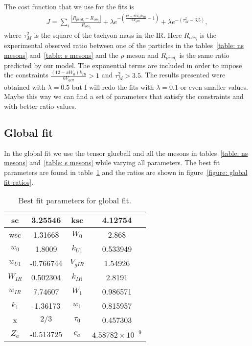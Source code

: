 \documentclass[a4paper,12pt]{article}
\begin{document}
The cost function that we use for the fits is
\begin{align}
J = \sum_{i} \frac{|R_{pred_i} - R_{obs_i}|}{R_{obs_i}} + \lambda e^{- \left(\frac{12-x W_0)k_{IR}}{6 V_{gIR}} - 1\right)} + \lambda e^{-\left( \tau_M^2 - 3.5 \right)},
\end{align}
where $\tau_M^2$ is the square of the tachyon mass in the IR. Here $R_{obs_i}$ is the experimental observed ratio between one of the particles in the tables~\ref{table: ns mesons} and~\ref{table: s mesons} and the $\rho$ meson and $R_{pred_i}$ is the same ratio predicted by our model. The exponential terms are included in order to impose the constraints $\frac{\left(12-x W_0\right)k_{IR}}{6 V_{gIR}} > 1$ and $\tau_M^2 > 3.5$. The results presented were obtained with $\lambda = 0.5$ but I will redo the fits with $\lambda = 0.1$ or even smaller values. Maybe this way we can find a set of parameters that satisfy the constraints and with better ratio values.

\subsection{Global fit}

In the global fit we use the tensor glueball  and all the mesons in tables~\ref{table: ns mesons} and~\ref{table: s mesons} while varying all parameters. The best fit parameters are found in table~\ref{table: global fit parameters} and the ratios are shown in figure~\ref{figure: global fit ratios}.

\begin{table}
\centering
\begin{tabular}{ | c | c | c | c |}
\hline
sc & 3.25546 & ksc & 4.12754 \\
\hline
wsc & 1.31668& $W_0$ & 2.868 \\
\hline
$w_0$ & 1.8009 & $k_{U1}$ & 0.533949 \\
\hline
$w_{U1}$ & -0.766744 & $V_{gIR}$ & 1.54926 \\
\hline
$W_{IR}$ & 0.502304 & $k_{IR}$ & 2.8191 \\
\hline
$w_{IR}$ & 7.74607 & $W_1$ & 0.986571 \\
\hline
$k_1$ & -1.36173 & $w_1$ & 0.815957 \\
\hline
x & $2/3$ & $\tau_0$ & 0.457303\\
\hline
$Z_a$ & -0.513725 & $c_a$ & $4.58782 \times 10^{-9} $\\
\hline
\end{tabular}
\caption{Best fit parameters for global fit.}
\label{table: global fit parameters} 
\end{table}
\end{document}
